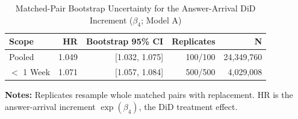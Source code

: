 \begin{table}[H]
\caption{Matched-Pair Bootstrap Uncertainty for the Answer-Arrival DiD Increment ($\beta_4$; Model A)}
\label{tab:pair_bootstrap}
\centering
\footnotesize
\begin{tabular}{@{}lrrrr@{}}
\toprule
\textbf{Scope} & \textbf{HR} & \textbf{Bootstrap 95\% CI} & \textbf{Replicates} & \textbf{N} \\
\midrule
Pooled & 1.049 & [1.032, 1.075] & 100/100 & 24,349,760 \\
$<$ 1 Week & 1.071 & [1.057, 1.084] & 500/500 & 4,029,008 \\
\bottomrule
\end{tabular}
\vspace{0.35em}
\begin{minipage}{\linewidth}
\footnotesize
\raggedright
\textbf{Notes:} Replicates resample whole matched pairs with replacement. HR is the answer-arrival increment $\exp(\beta_4)$, the DiD treatment effect.
\end{minipage}
\end{table}